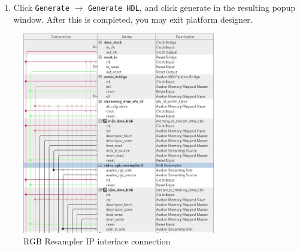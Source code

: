 \documentclass[11pt, twoside, pdftex]{article}
\begin{document}
\begin{enumerate}
    \item Click \texttt{Generate} $\rightarrow$ \texttt{Generate HDL}, and click generate in the resulting popup window. After this is completed, you may exit platform designer.
\end{enumerate}

\begin{figure}[h]
    \centering
    \includegraphics[width=0.75\textwidth]{figures/st_ip_connection.JPG}
    \caption{RGB Resampler IP interface connection}
    \label{fig:st_connection}
\end{figure}
\end{document}
